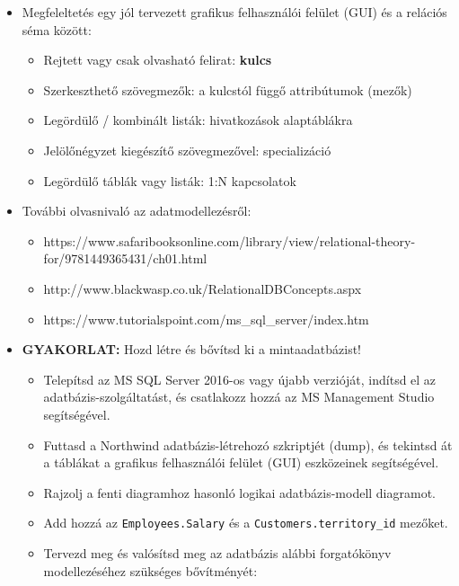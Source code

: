 \documentclass[
  magyar,
]{article}
\providecommand{\tightlist}{%
  \setlength{\itemsep}{0pt}\setlength{\parskip}{0pt}}
\begin{document}
\begin{itemize}
\item
  Megfeleltetés egy jól tervezett grafikus felhasználói felület (GUI) és
  a relációs séma között:

  \begin{itemize}
  \tightlist
  \item
    Rejtett vagy csak olvasható felirat: \textbf{kulcs}
  \item
    Szerkeszthető szövegmezők: a kulcstól függő attribútumok (mezők)
  \item
    Legördülő / kombinált listák: hivatkozások alaptáblákra
  \item
    Jelölőnégyzet kiegészítő szövegmezővel: specializáció
  \item
    Legördülő táblák vagy listák: 1:N kapcsolatok
  \end{itemize}
\item
  További olvasnivaló az adatmodellezésről:

  \begin{itemize}
  \tightlist
  \item
    https://www.safaribooksonline.com/library/view/relational-theory-for/9781449365431/ch01.html
  \item
    http://www.blackwasp.co.uk/RelationalDBConcepts.aspx
  \item
    https://www.tutorialspoint.com/ms\_sql\_server/index.htm
  \end{itemize}
\item
  \textbf{GYAKORLAT:} Hozd létre és bővítsd ki a mintaadatbázist!

  \begin{itemize}
  \item
    Telepítsd az MS SQL Server 2016-os vagy újabb verzióját, indítsd el
    az adatbázis-szolgáltatást, és csatlakozz hozzá az MS Management
    Studio segítségével.
  \item
    Futtasd a Northwind adatbázis-létrehozó szkriptjét (dump), és
    tekintsd át a táblákat a grafikus felhasználói felület (GUI)
    eszközeinek segítségével.
  \item
    Rajzolj a fenti diagramhoz hasonló logikai adatbázis-modell
    diagramot.
  \item
    Add hozzá az \texttt{Employees.Salary} és a
    \texttt{Customers.territory\_id} mezőket.
  \item
    Tervezd meg és valósítsd meg az adatbázis alábbi forgatókönyv
    modellezéséhez szükséges bővítményét:


\end{itemize}
\end{itemize}
\end{document}
